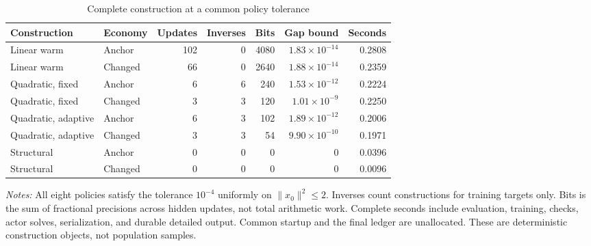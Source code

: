 \begin{table}[t]
\centering
\caption{Complete construction at a common policy tolerance}
\label{tab:r37construction}
\small\setlength{\tabcolsep}{3.2pt}
\begin{tabular}{llrrrrr}
\toprule
Construction & Economy & Updates & Inverses & Bits & Gap bound & Seconds\\
\midrule
Linear warm & Anchor & 102 & 0 & 4080 & $1.83\!\times\!10^{-14}$ & 0.2808\\
Linear warm & Changed & 66 & 0 & 2640 & $1.88\!\times\!10^{-14}$ & 0.2359\\
Quadratic, fixed & Anchor & 6 & 6 & 240 & $1.53\!\times\!10^{-12}$ & 0.2224\\
Quadratic, fixed & Changed & 3 & 3 & 120 & $1.01\!\times\!10^{-9}$ & 0.2250\\
Quadratic, adaptive & Anchor & 6 & 3 & 102 & $1.89\!\times\!10^{-12}$ & 0.2006\\
Quadratic, adaptive & Changed & 3 & 3 & 54 & $9.90\!\times\!10^{-10}$ & 0.1971\\
Structural & Anchor & 0 & 0 & 0 & $0$ & 0.0396\\
Structural & Changed & 0 & 0 & 0 & $0$ & 0.0096\\
\bottomrule
\end{tabular}
\par\smallskip\begin{minipage}{0.98\linewidth}\footnotesize
\emph{Notes:} All eight policies satisfy the tolerance $10^{-4}$ uniformly on $\|x_0\|^2\leq2$. Inverses count constructions for training targets only. Bits is the sum of fractional precisions across hidden updates, not total arithmetic work. Complete seconds include evaluation, training, checks, actor solves, serialization, and durable detailed output. Common startup and the final ledger are unallocated. These are deterministic construction objects, not population samples.
\end{minipage}
\end{table}
